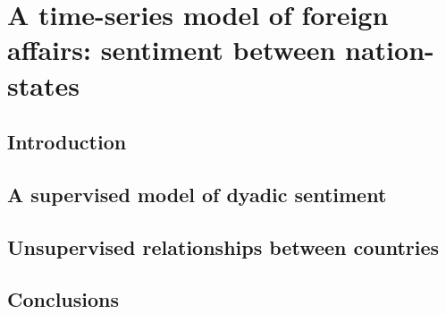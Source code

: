 \chapter{A time-series model of foreign affairs: sentiment between nation-states}
\label{chapter:foreign_relations}

\section*{Introduction}



\section*{A supervised model of dyadic sentiment}


\section*{Unsupervised relationships between countries}


\section*{Conclusions}

